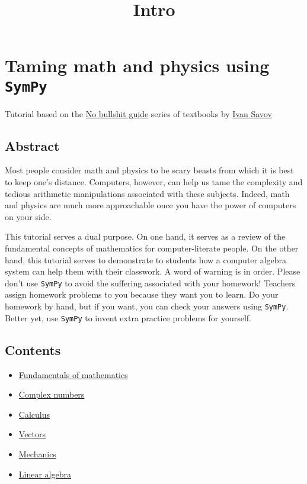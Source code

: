 \documentclass{article}
\title{Intro}
\begin{document}
    
    
    \maketitle
    
    

    
    \section{Taming math and physics using
\texttt{SymPy}}\label{taming-math-and-physics-using-sympy}

    Tutorial based on the \href{http://minireference.com/}{No bullshit
guide} series of textbooks by
\href{mailto:ivan.savov+SYMPYTUT@gmail.com}{Ivan Savov}

    \subsection{Abstract}\label{abstract}

    Most people consider math and physics to be scary beasts from which it
is best to keep one's distance. Computers, however, can help us tame the
complexity and tedious arithmetic manipulations associated with these
subjects. Indeed, math and physics are much more approachable once you
have the power of computers on your side.

This tutorial serves a dual purpose. On one hand, it serves as a review
of the fundamental concepts of mathematics for computer-literate people.
On the other hand, this tutorial serves to demonstrate to students how a
computer algebra system can help them with their classwork. A word of
warning is in order. Please don't use \texttt{SymPy} to avoid the
suffering associated with your homework! Teachers assign homework
problems to you because they want you to learn. Do your homework by
hand, but if you want, you can check your answers using \texttt{SymPy}.
Better yet, use \texttt{SymPy} to invent extra practice problems for
yourself.

    \subsection{Contents}\label{contents}

    \begin{itemize}
\itemsep1pt\parskip0pt
\item
  \href{Fundamentals-of-mathematics.ipynb}{Fundamentals of mathematics}
\item
  \href{Complex-numbers.ipynb}{Complex numbers}
\item
  \href{Calculus.ipynb}{Calculus}
\item
  \href{Vectors.ipynb}{Vectors}
\item
  \href{Mechanics.ipynb}{Mechanics}
\item
  \href{Linear-algebra.ipynb}{Linear algebra}
\end{itemize}
\end{document}
